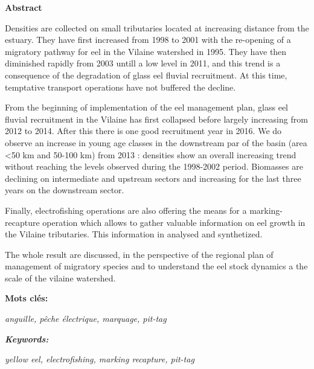 \documentclass[10pt,twocolumn,titlepage,twoside]{article}\usepackage[]{graphicx}\usepackage[]{color}
\begin{document}
\begin{tcolorbox}
   \vspace{8mm}
    
   \textbf{Abstract}\par
   
    \vspace{8mm}
    
\begin{itshape}
  Densities are collected on small tributaries located at increasing distance
  from the estuary. They have first increased from 1998 to 2001  with the re-opening of a
  migratory pathway for eel in the Vilaine watershed in 1995. They have then
  diminished rapidly from 2003 untill a low level in 2011, and
  this trend is a consequence of the degradation of glass eel fluvial
  recruitment. At this
  time, temptative transport operations have not buffered the decline.
  
  From the beginning of implementation of the eel management plan, glass eel
  fluvial recruitment in the Vilaine has first collapsed before largely
  increasing from 2012 to 2014. After this there is one good recruitment year
  in 2016.
  We do observe an increase in young age classes in the downstream par of the basin (area <50
  km and 50-100 km) from 2013 : densities show an overall increasing trend
  without reaching the levels observed during the 1998-2002 period. Biomasses are declining on
  intermediate and upstream sectors and increasing for the last three years on
  the downstream sector. 
    
  Finally, electrofishing operations are also offering the means for a
  marking-recapture operation which allows to gather valuable information on
 eel growth in the Vilaine tributaries. This information in analysed and
 synthetized. 
 
 The whole result are discussed, in the perspective of the regional plan of
 management of migratory species and to understand the eel stock dynamics a the
 scale of the vilaine watershed.
\end{itshape}




    \vspace{8mm}
    \textbf{Mots clés:}\par
     \textit{anguille, pêche électrique, marquage, pit-tag}\par 
    \vspace{8mm}    
     \textbf{\textit{Keywords:}}\par
     \textit{yellow eel, electrofishing, marking recapture, pit-tag}  
\end{tcolorbox}
\end{document}
